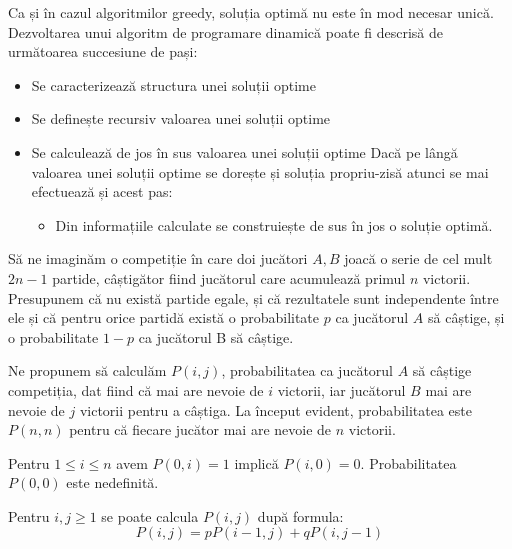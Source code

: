 \documentclass[9pt,a4paper]{article}
\begin{document}
Ca și în cazul algoritmilor greedy, soluția optimă nu este în mod necesar unică.
Dezvoltarea unui algoritm de programare dinamică poate fi descrisă de următoarea succesiune de pași:

\begin{itemize}
    \item Se caracterizează structura unei soluții optime
    \item Se definește recursiv valoarea unei soluții optime
    \item Se calculează de jos în sus valoarea unei soluții optime
    \newline Dacă pe lângă valoarea unei soluții optime se dorește și soluția 
    propriu-zisă atunci se mai efectuează și acest pas:
    \begin{itemize}
        \item Din informațiile calculate se construiește de sus în jos o soluție optimă.
    \end{itemize}
\end{itemize}

Să ne imaginăm o competiție în care doi jucători $A, B$ joacă o serie de cel mult $2n - 1$ partide, câștigător
fiind jucătorul care acumulează primul $n$ victorii. Presupunem că nu există partide egale, și că rezultatele sunt
independente între ele și că pentru orice partidă există o probabilitate $p$ ca jucătorul $A$ să câștige,
și o probabilitate $1 - p$ ca jucătorul B să câștige.

Ne propunem să calculăm $P(i,j)$, probabilitatea ca jucătorul $A$ să câștige competiția, dat fiind că mai are nevoie
de $i$ victorii, iar jucătorul $B$ mai are nevoie de $j$ victorii pentru a câștiga. La început evident, probabilitatea
este $P(n,n)$ pentru că fiecare jucător mai are nevoie de $n$ victorii.

Pentru $1 \leq i \leq n$ avem $P(0, i) = 1$ implică $P(i, 0) = 0$. Probabilitatea $P(0,0)$ este nedefinită.

Pentru $i, j \geq 1$ se poate calcula $P(i, j)$ după formula:
$$P(i,j) = pP(i-1,j) + qP(i,j-1)$$
\end{document}
